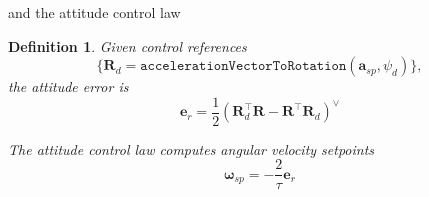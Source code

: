 \documentclass{article}
\theoremstyle{plain}
\newtheorem{defn}{Definition}
\begin{document}
and the attitude control law
\begin{defn}
    Given control references
    \begin{equation}
        \{\mathbf{R}_d = \mathtt{accelerationVectorToRotation}(\mathbf{a}_{sp},\psi_d)\},
    \end{equation}
    the attitude error is
    \begin{equation}
        \mathbf{e}_r = \frac{1}{2} \left(\mathbf{R}_d^\top\mathbf{R} - \mathbf{R}^\top\mathbf{R}_d\right)^\vee
    \end{equation}

    The attitude control law computes angular velocity setpoints
    \begin{equation}
        \boldsymbol{\omega}_{sp} = -\frac{2}{\tau}\mathbf{e}_r
    \end{equation}
\end{defn}
\end{document}
